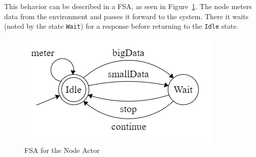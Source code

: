 This behavior can be described in a FSA, as seen in Figure~\ref{fig:node_states}. The node meters data from the environment and passes it forward to the system. There it waits (noted by the state \texttt{Wait}) for a response before returning to the \texttt{Idle} state.

\begin{figure}[ht]
    \includegraphics{include/figures/node_actor_fsm}
    \caption{FSA for the Node Actor}
    \label{fig:node_states}
\end{figure}






